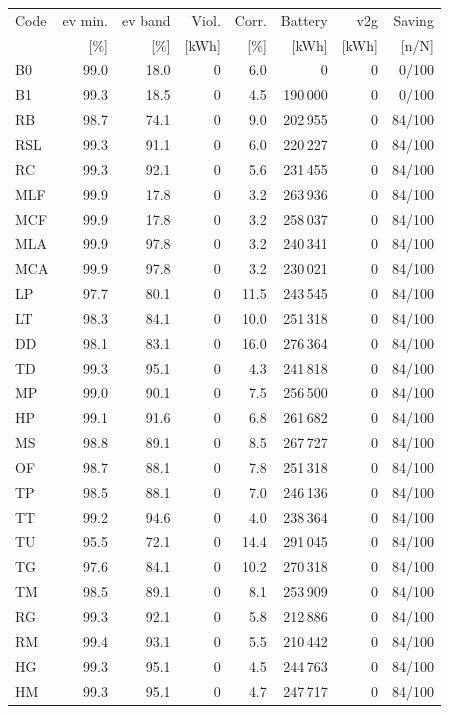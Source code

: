 \noindent\begin{minipage}{\textwidth}\singlespacing\captionsetup{font=footnotesize}
\setlength{\tabcolsep}{4pt}
\renewcommand{\arraystretch}{1.0}
\label{tab:full-scorecard-5-1}
\fontsize{8}{9}\selectfont
\begin{tabular*}{\textwidth}{@{\extracolsep{\fill}}lrrrrrrr@{}}
\toprule
Code & \gls{ev} min. & \gls{ev} band & Viol. & Corr. & Battery & \gls{v2g} & Saving\\
 & [\%] & [\%] & [kWh] & [\%] & [kWh] & [kWh] & [n/N]\\
\midrule
B0 & 99.0 & 18.0 & 0 & 6.0 & 0 & 0 & 0/100\\
B1 & 99.3 & 18.5 & 0 & 4.5 & 190\,000 & 0 & 0/100\\
RB & 98.7 & 74.1 & 0 & 9.0 & 202\,955 & 0 & 84/100\\
RSL & 99.3 & 91.1 & 0 & 6.0 & 220\,227 & 0 & 84/100\\
RC & 99.3 & 92.1 & 0 & 5.6 & 231\,455 & 0 & 84/100\\
MLF & 99.9 & 17.8 & 0 & 3.2 & 263\,936 & 0 & 84/100\\
MCF & 99.9 & 17.8 & 0 & 3.2 & 258\,037 & 0 & 84/100\\
MLA & 99.9 & 97.8 & 0 & 3.2 & 240\,341 & 0 & 84/100\\
MCA & 99.9 & 97.8 & 0 & 3.2 & 230\,021 & 0 & 84/100\\
LP & 97.7 & 80.1 & 0 & 11.5 & 243\,545 & 0 & 84/100\\
LT & 98.3 & 84.1 & 0 & 10.0 & 251\,318 & 0 & 84/100\\
DD & 98.1 & 83.1 & 0 & 16.0 & 276\,364 & 0 & 84/100\\
TD & 99.3 & 95.1 & 0 & 4.3 & 241\,818 & 0 & 84/100\\
MP & 99.0 & 90.1 & 0 & 7.5 & 256\,500 & 0 & 84/100\\
HP & 99.1 & 91.6 & 0 & 6.8 & 261\,682 & 0 & 84/100\\
MS & 98.8 & 89.1 & 0 & 8.5 & 267\,727 & 0 & 84/100\\
OF & 98.7 & 88.1 & 0 & 7.8 & 251\,318 & 0 & 84/100\\
TP & 98.5 & 88.1 & 0 & 7.0 & 246\,136 & 0 & 84/100\\
TT & 99.2 & 94.6 & 0 & 4.0 & 238\,364 & 0 & 84/100\\
TU & 95.5 & 72.1 & 0 & 14.4 & 291\,045 & 0 & 84/100\\
TG & 97.6 & 84.1 & 0 & 10.2 & 270\,318 & 0 & 84/100\\
TM & 98.5 & 89.1 & 0 & 8.1 & 253\,909 & 0 & 84/100\\
RG & 99.3 & 92.1 & 0 & 5.8 & 212\,886 & 0 & 84/100\\
RM & 99.4 & 93.1 & 0 & 5.5 & 210\,442 & 0 & 84/100\\
HG & 99.3 & 95.1 & 0 & 4.5 & 244\,763 & 0 & 84/100\\
HM & 99.3 & 95.1 & 0 & 4.7 & 247\,717 & 0 & 84/100\\
\bottomrule\end{tabular*}
\end{minipage}\par\medskip
